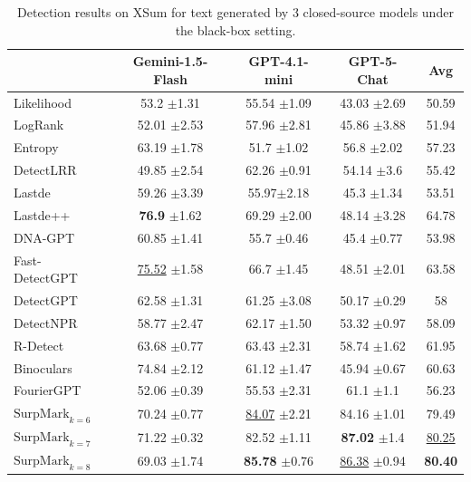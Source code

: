 \documentclass{article}
\newcommand{\com}[1]{\tiny$\pm$#1}
\theoremstyle{plain}
\theoremstyle{definition}
\theoremstyle{remark}
\begin{document}
\begin{table}[htbp]
\centering
{\scriptsize
\begin{tabular}{lcccc}
\toprule
& Gemini-1.5-Flash & GPT-4.1-mini & GPT-5-Chat & Avg  \\
\midrule
Likelihood & 53.2 \com 1.31 & 55.54 \com 1.09 & 43.03 \com 2.69 &  50.59 \\

LogRank & 52.01 \com 2.53 & 57.96 \com 2.81 & 45.86 \com 3.88 & 51.94 \\

Entropy & 63.19 \com 1.78 & 51.7 \com 1.02 & 56.8 \com 2.02 &  57.23\\

DetectLRR & 49.85 \com 2.54 & 62.26 \com 0.91 & 54.14 \com 3.6 & 55.42 \\

Lastde & 59.26 \com 3.39 & 55.97\com 2.18& 45.3 \com 1.34 & 53.51 \\

Lastde++ & \textbf{76.9} \com 1.62& 69.29 \com 2.00 & 48.14 \com 3.28& 64.78 \\

DNA-GPT &60.85 \com 1.41 & 55.7 \com 0.46 & 45.4 \com 0.77 &  53.98\\

Fast-DetectGPT & \underline{75.52} \com 1.58 & 66.7 \com 1.45 & 48.51 \com 2.01 & 63.58 \\

DetectGPT &62.58 \com 1.31 & 61.25 \com 3.08& 50.17 \com 0.29 & 58 \\

DetectNPR & 58.77 \com 2.47 & 62.17 \com 1.50 & 53.32 \com 0.97 & 58.09\\

R-Detect & 63.68  \com 0.77 & 63.43 \com 2.31 & 58.74 \com 1.62 & 61.95\\

Binoculars & 74.84  \com 2.12 & 61.12 \com 1.47 & 45.94 \com 0.67 & 60.63\\

FourierGPT & 52.06  \com 0.39 & 55.53 \com 2.31 & 61.1 \com 1.1 &  56.23\\

\rowcolor{ours}$\text{SurpMark}_{k=6}$ & 70.24 \com 0.77 & \underline{84.07} \com 2.21 & 84.16 \com 1.01 & 79.49 \\

\rowcolor{ours}$\text{SurpMark}_{k=7}$ & 71.22 \com 0.32 & 82.52 \com 1.11 & \textbf{87.02} \com 1.4 & \underline{80.25}\\
\rowcolor{ours}$\text{SurpMark}_{k=8}$ & 69.03 \com 1.74 & \textbf{85.78} \com 0.76 & \underline{86.38} \com 0.94 & \textbf{80.40}\\
\bottomrule
\end{tabular}}
\caption{Detection results on XSum for text generated by 3 closed-source models under the black-box setting.}
\label{tab:closesource-xsum}
\end{table}
\end{document}
